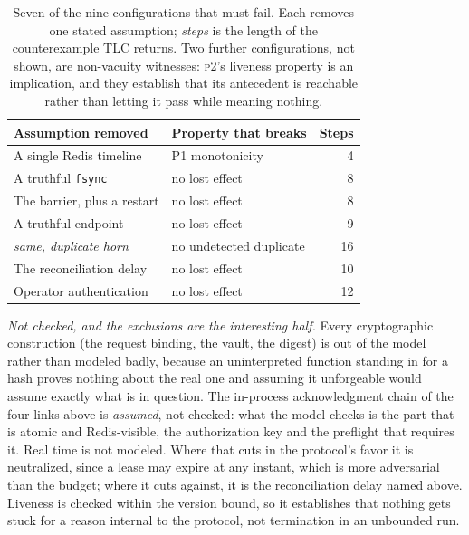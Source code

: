 \begin{table}[t]
\centering
\caption{Seven of the nine configurations that must fail. Each removes one
stated assumption; \emph{steps} is the length of the counterexample TLC
returns. Two further configurations, not shown, are non-vacuity witnesses:
\textsc{p2}'s liveness property is an implication, and they establish that its
antecedent is reachable rather than letting it pass while meaning nothing.}
\label{tab:modelchecking}
\small
\begin{tabular}{@{}p{}p{}r@{}}
\toprule
Assumption removed & Property that breaks & Steps \\
\midrule
A single Redis timeline   & P1 monotonicity      & 4 \\  %
A truthful \texttt{fsync} & no lost effect       & 8 \\  %
The barrier, plus a restart & no lost effect     & 8 \\  %
A truthful endpoint       & no lost effect       & 9 \\  %
\quad\emph{same, duplicate horn} & no undetected duplicate & 16 \\ %
The reconciliation delay  & no lost effect       & 10 \\ %
Operator authentication   & no lost effect       & 12 \\ %
\bottomrule
\end{tabular}
\end{table}

\emph{Not checked, and the exclusions are the interesting half.} Every
cryptographic construction (the request binding, the vault, the digest) is
out of the model rather than modeled badly, because an uninterpreted function
standing in for a hash proves nothing about the real one and assuming it
unforgeable would assume exactly what is in question. The in-process
acknowledgment chain of the four links above is \emph{assumed}, not checked:
what the model checks is the part that is atomic and Redis-visible, the
authorization key and the preflight that requires it. Real time is not
modeled. Where that cuts in the protocol's favor it is neutralized, since a
lease may expire at any instant, which is more adversarial than the budget;
where it cuts against, it is the reconciliation delay named above. Liveness is
checked within the version bound, so it establishes that nothing gets stuck for
a reason internal to the protocol, not termination in an unbounded run.

